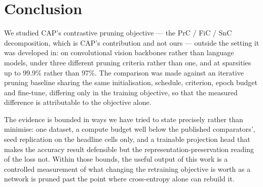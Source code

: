 \section{Conclusion}
\label{sec:conclusion}

We studied CAP's contrastive pruning objective \citep{xu2022cap} --- the PrC / FiC
/ SnC decomposition, which is CAP's contribution and not ours --- outside the
setting it was developed in: on convolutional vision backbones rather than
language models, under three different pruning criteria rather than one, and at
sparsities up to 99.9\% rather than 97\%. The comparison was made against an
iterative pruning baseline sharing the same initialisation, schedule, criterion,
epoch budget and fine-tune, differing only in the training objective, so that the
measured difference is attributable to the objective alone.

The evidence is bounded in ways we have tried to state precisely rather than
minimise: one dataset, a compute budget well below the published comparators',
seed replication on the headline cells only, and a trainable projection head that
makes the accuracy result defensible but the representation-preservation reading
of the loss not. Within those bounds, the useful output of this work is a
controlled measurement of what changing the retraining objective is worth as a
network is pruned past the point where cross-entropy alone can rebuild it.
